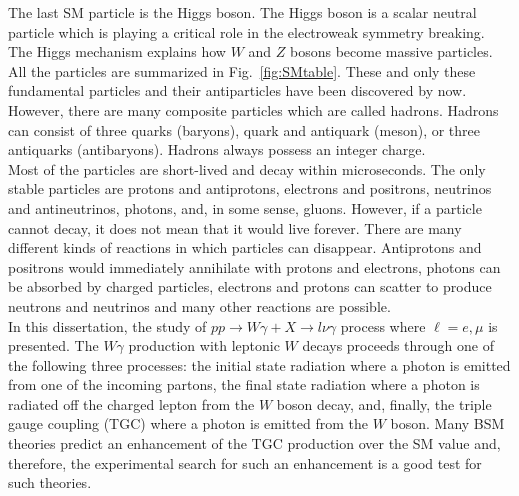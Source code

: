 The last SM particle is the Higgs boson. The Higgs boson is a scalar neutral particle which is playing a critical role in the electroweak symmetry breaking. The Higgs mechanism explains how $W$ and $Z$ bosons become massive particles.\\

All the particles are summarized in Fig.~\ref{fig:SMtable}. These and only these fundamental particles and their antiparticles have been discovered by now. However, there are many composite particles which are called hadrons. Hadrons can consist of three quarks (baryons), quark and antiquark (meson), or three antiquarks (antibaryons). Hadrons always possess an integer charge.\\

Most of the particles are short-lived and decay within microseconds. The only stable particles are protons and antiprotons, electrons and positrons, neutrinos and antineutrinos, photons, and, in some sense, gluons. However, if a particle cannot decay, it does not mean that it would live forever. There are many different kinds of reactions in which particles can disappear. Antiprotons and positrons would immediately annihilate with protons and electrons, photons can be absorbed by charged particles, electrons and protons can scatter to produce neutrons and neutrinos and many other reactions are possible.\\ 

In this dissertation, the study of $pp\rightarrow W\gamma + X \rightarrow l \nu \gamma$ process where $\ell = e, \mu$ is presented. The $W\gamma$ production with leptonic $W$ decays proceeds through one of the following three processes: the initial state radiation where a photon is emitted from one of the incoming partons, the final state radiation where a photon is radiated off the charged lepton from the $W$ boson decay, and, finally, the triple gauge coupling (TGC) where a photon is emitted from the $W$ boson. Many BSM theories predict an enhancement of the TGC production over the SM value and, therefore, the experimental search for such an enhancement is a good test for such theories.\\ 

